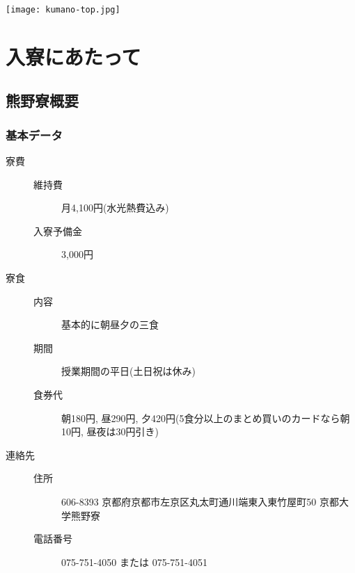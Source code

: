 \documentclass[10pt,b5jsbook,dvips,dvipdfmx,openany]{jsbook}
\theoremstyle{definition}
\begin{document}
   
\texttt{[image: kumano-top.jpg]}

\chapter{入寮にあたって}
	\section{熊野寮概要} \label{sec:abst}

		\subsection{基本データ} \label{subsec:data}
		\begin{description} 
		\item[寮費] \hspace{10mm}
			\begin{description}
			\item[維持費] 月4,100円(水光熱費込み)
			\item[入寮予備金] 3,000円
			\end{description}
		\item[寮食] \hspace{10mm} 
			\begin{description}
			\item[内容] 基本的に朝昼夕の三食
			\item[期間] 授業期間の平日(土日祝は休み)
			\item[食券代] 朝180円, 昼290円, 夕420円(5食分以上のまとめ買いのカードなら朝10円, 昼夜は30円引き)
			\end{description}
		\item[連絡先] \hspace{10mm} 
			\begin{description}
			\item[住所]606-8393 京都府京都市左京区丸太町通川端東入東竹屋町50 京都大学熊野寮
			\item[電話番号] 075-751-4050 または 075-751-4051
			\end{description}
		\end{description}

\end{document}
